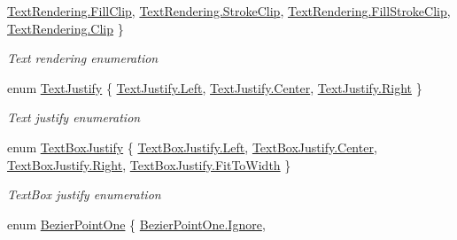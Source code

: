 \begin{DoxyCompactItemize}
\hyperlink{namespace_pdf_file_writer_ab466009e4cbb95b7157a6548dd75914baba031a06057d7675c78780088b373d70}{Text\+Rendering.\+Fill\+Clip}, 
\hyperlink{namespace_pdf_file_writer_ab466009e4cbb95b7157a6548dd75914ba3b62e0dad1bfa859a279a6828c8078cb}{Text\+Rendering.\+Stroke\+Clip}, 
\hyperlink{namespace_pdf_file_writer_ab466009e4cbb95b7157a6548dd75914bacbda18883f97563d59f63b09d6dca8fe}{Text\+Rendering.\+Fill\+Stroke\+Clip}, 
\hyperlink{namespace_pdf_file_writer_ab466009e4cbb95b7157a6548dd75914ba6adac929b615be2e0d213eb9d1ad15ba}{Text\+Rendering.\+Clip}
 \}\begin{DoxyCompactList}\small\item\em Text rendering enumeration \end{DoxyCompactList}
\item 
enum \hyperlink{namespace_pdf_file_writer_a3991bfacc8c7be240452dd24ec817157}{Text\+Justify} \{ \hyperlink{namespace_pdf_file_writer_a3991bfacc8c7be240452dd24ec817157a945d5e233cf7d6240f6b783b36a374ff}{Text\+Justify.\+Left}, 
\hyperlink{namespace_pdf_file_writer_a3991bfacc8c7be240452dd24ec817157a4f1f6016fc9f3f2353c0cc7c67b292bd}{Text\+Justify.\+Center}, 
\hyperlink{namespace_pdf_file_writer_a3991bfacc8c7be240452dd24ec817157a92b09c7c48c520c3c55e497875da437c}{Text\+Justify.\+Right}
 \}\begin{DoxyCompactList}\small\item\em Text justify enumeration \end{DoxyCompactList}
\item 
enum \hyperlink{namespace_pdf_file_writer_acc2474cdbd7c2cbc188a4a852e439459}{Text\+Box\+Justify} \{ \hyperlink{namespace_pdf_file_writer_acc2474cdbd7c2cbc188a4a852e439459a945d5e233cf7d6240f6b783b36a374ff}{Text\+Box\+Justify.\+Left}, 
\hyperlink{namespace_pdf_file_writer_acc2474cdbd7c2cbc188a4a852e439459a4f1f6016fc9f3f2353c0cc7c67b292bd}{Text\+Box\+Justify.\+Center}, 
\hyperlink{namespace_pdf_file_writer_acc2474cdbd7c2cbc188a4a852e439459a92b09c7c48c520c3c55e497875da437c}{Text\+Box\+Justify.\+Right}, 
\hyperlink{namespace_pdf_file_writer_acc2474cdbd7c2cbc188a4a852e439459a8184936ce85c5e631b576415fb9581b9}{Text\+Box\+Justify.\+Fit\+To\+Width}
 \}\begin{DoxyCompactList}\small\item\em Text\+Box justify enumeration \end{DoxyCompactList}
\item 
enum \hyperlink{namespace_pdf_file_writer_a12a19c6c1faeda33d34ad5a36130b1bf}{Bezier\+Point\+One} \{ \hyperlink{namespace_pdf_file_writer_a12a19c6c1faeda33d34ad5a36130b1bfafd038fc7f319e48f3115d92bf5bdbef9}{Bezier\+Point\+One.\+Ignore}, 

\end{DoxyCompactItemize}
